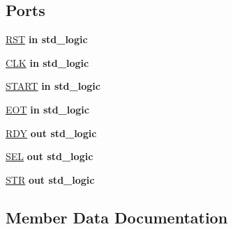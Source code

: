 \subsection*{Ports}
 \begin{DoxyCompactItemize}
\item 
\hyperlink{class_f_s_m16__control_a98682ef7de2714e5bab788a2e2ff1b7f}{R\+S\+T}  {\bfseries {\bfseries \textcolor{keywordflow}{in}\textcolor{vhdlchar}{ }}} {\bfseries \textcolor{comment}{std\+\_\+logic}\textcolor{vhdlchar}{ }} 
\item 
\hyperlink{class_f_s_m16__control_ab5d0ea9e968d49d94da9db07a979d402}{C\+L\+K}  {\bfseries {\bfseries \textcolor{keywordflow}{in}\textcolor{vhdlchar}{ }}} {\bfseries \textcolor{comment}{std\+\_\+logic}\textcolor{vhdlchar}{ }} 
\item 
\hyperlink{class_f_s_m16__control_a85be3e029f471189e7375b9096e537b8}{S\+T\+A\+R\+T}  {\bfseries {\bfseries \textcolor{keywordflow}{in}\textcolor{vhdlchar}{ }}} {\bfseries \textcolor{comment}{std\+\_\+logic}\textcolor{vhdlchar}{ }} 
\item 
\hyperlink{class_f_s_m16__control_a2410fb83e713378bb7e0f7ae0b31ea53}{E\+O\+T}  {\bfseries {\bfseries \textcolor{keywordflow}{in}\textcolor{vhdlchar}{ }}} {\bfseries \textcolor{comment}{std\+\_\+logic}\textcolor{vhdlchar}{ }} 
\item 
\hyperlink{class_f_s_m16__control_a55705306de14b0deb930f8f028a6a288}{R\+D\+Y}  {\bfseries {\bfseries \textcolor{keywordflow}{out}\textcolor{vhdlchar}{ }}} {\bfseries \textcolor{comment}{std\+\_\+logic}\textcolor{vhdlchar}{ }} 
\item 
\hyperlink{class_f_s_m16__control_ab1572616d15079c78b7297ae0def7ec0}{S\+E\+L}  {\bfseries {\bfseries \textcolor{keywordflow}{out}\textcolor{vhdlchar}{ }}} {\bfseries \textcolor{comment}{std\+\_\+logic}\textcolor{vhdlchar}{ }} 
\item 
\hyperlink{class_f_s_m16__control_abde88eb8893c125e351db55429f78887}{S\+T\+R}  {\bfseries {\bfseries \textcolor{keywordflow}{out}\textcolor{vhdlchar}{ }}} {\bfseries \textcolor{comment}{std\+\_\+logic}\textcolor{vhdlchar}{ }} 
\end{DoxyCompactItemize}


\subsection{Member Data Documentation}
\hypertarget{class_f_s_m16__control_ab5d0ea9e968d49d94da9db07a979d402}{}
